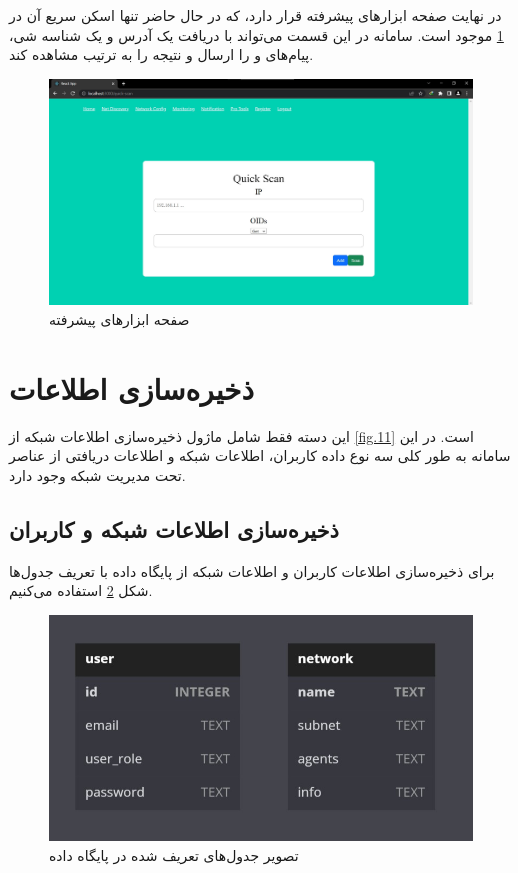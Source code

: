 در نهایت صفحه ابزارهای پیشرفته قرار دارد، که در حال حاضر تنها اسکن سریع آن در \cref{fig.120} موجود است. سامانه در این قسمت می‌تواند با دریافت یک آدرس و یک شناسه شی، پیام‌های  و  را ارسال و نتیجه را به ترتیب مشاهده کند. 

\begin{figure}[!h]
    \centering\includegraphics[scale=.38]{./pro-tools}
    \caption{صفحه ابزارهای پیشرفته}\label{fig.120}
\end{figure}



\cleardoublepage

\section{ذخیره‌سازی اطلاعات}

این دسته فقط شامل ماژول ذخیره‌سازی اطلاعات شبکه از \cref{fig.11} است. در این سامانه به طور کلی سه نوع داده کاربران، اطلاعات شبکه و اطلاعات دریافتی از عناصر تحت مدیریت شبکه وجود دارد. 



\subsection{ذخیره‌سازی اطلاعات شبکه و کاربران}

برای ذخیره‌سازی اطلاعات کاربران و اطلاعات شبکه از پایگاه داده  با تعریف جدول‌ها شکل \cref{fig.121} استفاده می‌کنیم.

\begin{figure}[!h]
    \centering\includegraphics[scale=.60]{./db}
    \caption{تصویر جدول‌های تعریف شده در پایگاه داده }\label{fig.121}
\end{figure}


